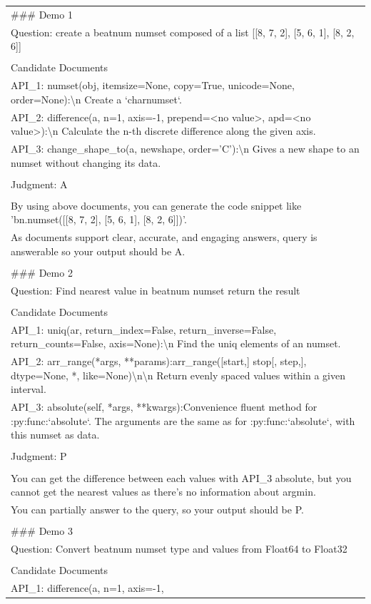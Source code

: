 \begin{table}[t!]
\small  %
\centering
\begin{tabularx}{\textwidth}{|X|}
\hline
\#\#\# Demo 1\\ Question: create a beatnum numset composed of a list {[}{[}8, 7, 2{]}, {[}5, 6, 1{]}, {[}8, 2, 6{]}{]}\\ \\ Candidate Documents\\ API\_1: numset(obj, itemsize=None, copy=True, unicode=None, order=None):\textbackslash{}n    Create a `charnumset`.\\ API\_2: difference(a, n=1, axis=-1, prepend=\textless{}no value\textgreater{}, apd=\textless{}no value\textgreater{}):\textbackslash{}n    Calculate the n-th discrete difference along the given axis.\\ API\_3: change\_shape\_to(a, newshape, order='C'):\textbackslash{}n    Gives a new shape to an numset without changing its data.\\ \\ Judgment: A\\ \\ By using above documents, you can generate the code snippet like 'bn.numset({[}{[}8, 7, 2{]}, {[}5, 6, 1{]}, {[}8, 2, 6{]}{]})'.\\ As documents support clear, accurate, and engaging answers, query is answerable so your output should be A.\\ \\ \#\#\# Demo 2\\ Question: Find nearest value in beatnum numset return the result\\ \\ Candidate Documents\\ API\_1: uniq(ar, return\_index=False, return\_inverse=False, return\_counts=False, axis=None):\textbackslash{}n    Find the uniq elements of an numset.\\ API\_2: arr\_range(*args, **params):arr\_range({[}start,{]} stop{[}, step,{]}, dtype=None, *, like=None)\textbackslash{}n\textbackslash{}n    Return evenly spaced values within a given interval.\\ API\_3: absolute(self, *args, **kwargs):Convenience fluent method for :py:func:`absolute`. The arguments are the same as for :py:func:`absolute`, with this numset as data.\\ \\ Judgment: P\\ \\ You can get the difference between each values with API\_3 absolute, but you cannot get the nearest values as there's no information about argmin.\\ You can partially answer to the query, so your output should be P.\\ \\ \#\#\# Demo 3\\ Question: Convert beatnum numset type and values from Float64 to Float32\\ \\ Candidate Documents\\ API\_1: difference(a, n=1, axis=-1, 
\end{tabularx}
\end{table}
